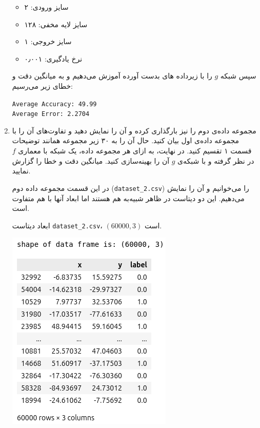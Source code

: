 \begin{enumerate}
\begin{qsolve}
		\begin{itemize}
			\item سایز ورودی: ۲
			\item سایز لایه مخفی: ۱۲۸
			\item سایز خروجی:‌ ۱
			\item نرخ یادگیری: ۰٫۰۰۱	
		\end{itemize}
		
		سپس شبکه $g$ را با زیرداده های بدست آورده آموزش می‌دهیم و به میانگین دقت و خطای زیر می‌رسیم:
		
		\begin{latin}
			\texttt{Average Accuracy: 49.99}\\
			\texttt{Average Error: 2.2704}
		\end{latin}
	\end{qsolve}






	\item
مجموعه داده‌ی دوم را نیز بارگذاری کرده و آن را نمایش دهید و تفاوت‌های آن را با مجموعه داده‌ی اول بیان کنید. حال آن را به ۳۰ زیر مجموعه همانند توضیحات قسمت ۱ تقسیم کنید. در نهایت، به ازای هر مجموعه داده، یک شبکه با معماری $f$ در نظر گرفته و با شبکه‌ی $g$ آن را بهینه‌سازی کنید. میانگین دقت و خطا را گزارش نمایید.


	\begin{qsolve}
در این قسمت مجموعه داده دوم (\texttt{dataset\_2.csv}) را می‌خوانیم و آن را نمایش می‌دهیم. این دو دیتاست در ظاهر شبیه‌به هم هستند اما ابعاد آنها با هم متفاوت است. 

ابعاد دیتاست \texttt{dataset\_2.csv}، $(60000, 3)$ است.

	\begin{center}
		\includegraphics*[width=0.4\linewidth]{pics/img4.png}
		\label{خروجی دیتاست ۲}
	\end{center}
	

\end{qsolve}
\end{enumerate}
